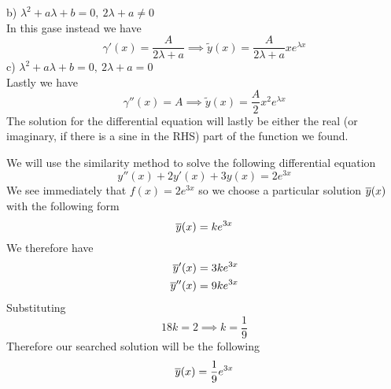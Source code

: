 \documentclass[../complete.tex]{subfiles}
\begin{document}
\begin{mtd}
	b) $\lambda^2+a\lambda+b=0,\ 2\lambda+a\ne0$\\
	In this gase instead we have
	\begin{equation*}
		\gamma'(x)=\frac{A}{2\lambda+a}\implies \tilde{y}(x)=\frac{A}{2\lambda+a}xe^{\lambda x}
	\end{equation*}
	c) $\lambda^2+a\lambda+b=0,\ 2\lambda+a=0$\\
	Lastly we have
	\begin{equation*}
		\gamma''(x)=A\implies \tilde{y}(x)=\frac{A}{2}x^2e^{\lambda x}
	\end{equation*}
	The solution for the differential equation will lastly be either the real (or imaginary, if there is a sine in the RHS) part of the function we found.
\end{mtd}
\begin{eg}
	We will use the similarity method to solve the following differential equation
	\begin{equation*}
		y''(x)+2y'(x)+3y(x)=2e^{3x}
	\end{equation*}
	We see immediately that $f(x)=2e^{3x}$ so we choose a particular solution $\overline{y}(x)$ with the following form
	\begin{equation*}
		\overline{y}(x)=ke^{3x}
	\end{equation*}
	We therefore have
	\begin{equation*}
		\begin{aligned}
			\overline{y}'(x)&=3ke^{3x}\\
			\overline{y}''(x)&=9ke^{3x}
		\end{aligned}
	\end{equation*}
	Substituting
	\begin{equation*}
		18k=2\implies k=\frac{1}{9}
	\end{equation*}
	Therefore our searched solution will be the following
	\begin{equation*}
		\overline{y}(x)=\frac{1}{9}e^{3x}
	\end{equation*}
\end{eg}
\end{document}
